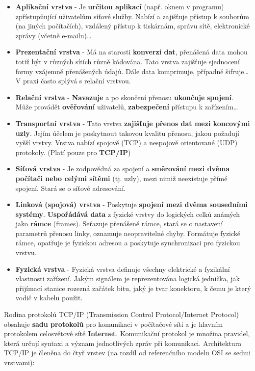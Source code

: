 \begin{itemize}
\item\textbf{Aplikační vrstva }- Je \textbf{určitou aplikací} (např. oknem v programu) zpřístupňující uživatelům síťové služby. Nabízí a zajišťuje přístup k souborům (na jiných počítačích), vzdálený přístup k tiskárnám, správu sítě, elektronické zprávy (včetně e-mailu)…
\item\textbf{Prezentační vrstva} - Má na starosti \textbf{konverzi dat}, přenášená data mohou totiž být v různých sítích různě kódována. Tato vrstva zajišťuje sjednocení formy vzájemně přenášených údajů. Dále data komprimuje, případně šifruje… V praxi často splývá s relační vrstvou.
\item \textbf{Relační vrstva} - \textbf{Navazuje} a po skončení přenosu \textbf{ukončuje} \textbf{spojení}. Může provádět \textbf{ověřování} uživatelů, \textbf{zabezpečení} přístupu k zařízením…
\item\textbf{Transportní vrstva} - Tato vrstva\textbf{ zajišťuje přenos dat mezi koncovými uzly}. Jejím účelem je poskytnout takovou kvalitu přenosu, jakou požadují vyšší vrstvy. Vrstva nabízí spojově (TCP) a nespojově orientované (UDP) protokoly. (Platí pouze pro \textbf{TCP/IP})
\item\textbf{Síťová vrstva }- Je zodpovědná za spojení a \textbf{směrování mezi dvěma počítači nebo celými sítěmi} (tj. uzly), mezi nimiž neexistuje přímé spojení. Stará se o síťové adresování.
\item \textbf{Linková (spojová) vrstva }- Poskytuje \textbf{spojení mezi dvěma sousedními systémy}. \textbf{Uspořádává data} z fyzické vrstvy do logických celků známých jako \textbf{rámce} (frames). Seřazuje přenášené rámce, stará se o nastavení parametrů přenosu linky, oznamuje neopravitelné chyby. Formátuje fyzické rámce, opatřuje je fyzickou adresou a poskytuje synchronizaci pro fyzickou vrstvu.
\item\textbf{Fyzická vrstva }- Fyzická vrstva definuje všechny elektrické a fyzikální vlastnosti zařízení. Jakým signálem je reprezentována logická jednička, jak přijímací stanice rozezná začátek bitu, jaký je tvar konektoru, k čemu je který vodič v kabelu použit.
\end{itemize}


Rodina protokolů TCP/IP (Transmission Control Protocol/Internet Protocol) obsahuje \textbf{sadu protokolů} pro komunikaci v počítačové síti a je hlavním protokolem celosvětové sítě \textbf{Internet}. Komunikační protokol je množina pravidel, která určují syntaxi a význam jednotlivých zpráv při komunikaci. Architektura TCP/IP je členěna do čtyř vrstev (na rozdíl od referenčního modelu OSI se sedmi vrstvami):

